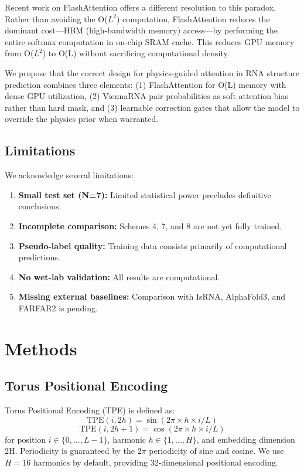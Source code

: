 \documentclass[12pt]{article}
\begin{document}
Recent work on FlashAttention \citep{dao2023} offers a different resolution to this paradox. Rather than avoiding the O($L^2$) computation, FlashAttention reduces the dominant cost---HBM (high-bandwidth memory) access---by performing the entire softmax computation in on-chip SRAM cache. This reduces GPU memory from O($L^2$) to O(L) without sacrificing computational density.

We propose that the correct design for physics-guided attention in RNA structure prediction combines three elements: (1) FlashAttention for O(L) memory with dense GPU utilization, (2) ViennaRNA pair probabilities as soft attention bias rather than hard mask, and (3) learnable correction gates that allow the model to override the physics prior when warranted.

\subsection{Limitations}

We acknowledge several limitations:
\begin{enumerate}
\item \textbf{Small test set (N=7):} Limited statistical power precludes definitive conclusions.
\item \textbf{Incomplete comparison:} Schemes 4, 7, and 8 are not yet fully trained.
\item \textbf{Pseudo-label quality:} Training data consists primarily of computational predictions.
\item \textbf{No wet-lab validation:} All results are computational.
\item \textbf{Missing external baselines:} Comparison with IsRNA, AlphaFold3, and FARFAR2 is pending.
\end{enumerate}

\section{Methods}

\subsection{Torus Positional Encoding}

Torus Positional Encoding (TPE) is defined as:
\begin{equation}
\text{TPE}(i, 2h) = \sin(2\pi \times h \times i / L)
\end{equation}
\begin{equation}
\text{TPE}(i, 2h+1) = \cos(2\pi \times h \times i / L)
\end{equation}
for position $i \in \{0, ..., L-1\}$, harmonic $h \in \{1, ..., H\}$, and embedding dimension 2H. Periodicity is guaranteed by the $2\pi$ periodicity of sine and cosine. We use $H = 16$ harmonics by default, providing 32-dimensional positional encoding.
\end{document}
